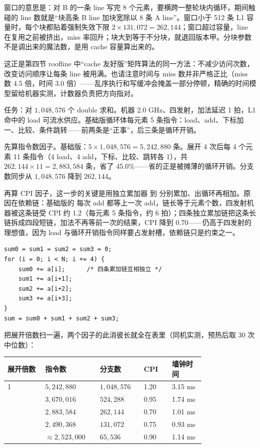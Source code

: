 窗口的意思是：对 B 的一条 line 写完 8 个元素，要横跨一整轮块内循环，期间触碰的 line 数就是“块高条 B line 加块宽除以 8 条 A line”。窗口小于 512 条 L1 容量时，每个块都贴着强制失效下限 $2\times131{,}072=262{,}144$；窗口超过容量，line 在复用之前被挤出，miss 率回升；块大到等于不分块，就退回版本甲。分块参数不是调出来的魔法数，是用 cache 容量算出来的。

这正是第四节 roofline 中“cache 友好版”矩阵算法的同一方法：不减少访问次数，改变访问顺序让每条 line 被用满。也请注意时间与 miss 数并非严格正比（miss 数 4.5 倍，时间 3.0 倍）——乱序执行和写缓冲会掩盖一部分停顿，精确的时间模型留给机器实测，计数器负责把方向指对。

任务：对 $1{,}048{,}576$ 个 double 求和。机器 2.0 GHz、四发射，加法延迟 1 拍，L1 命中的 load 可流水供应。基础版循环体每元素 5 条指令：load、add、下标加一、比较、条件跳转——前两条是“正事”，后三条是循环开销。

先算指令数因子。基础版：$5\times1{,}048{,}576=5{,}242{,}880$ 条。展开 4 次后每 4 个元素 11 条指令（4 load、4 add，下标、比较、跳转各 1），共 $262{,}144\times11=2{,}883{,}584$ 条，省了 45.0\%——省的正是被摊薄的循环开销。分支数同步从 $1{,}048{,}576$ 降到 $262{,}144$。

再算 CPI 因子，这一步的关键是用独立累加器  到  分别累加、出循环再相加。原因在依赖链：基础版的  每次 add 都等上一次 add，链长等于元素个数，四发射机器被这条链受 CPI 约 1.2（每元素 5 条指令，约 6 拍）；四条独立累加链把这条长链拆成四段短链，加法不再等前一次的结果，CPI 降到 0.70——仍高于四发射的理想值，因为 load 与循环开销指令同样要占发射槽，依赖链只是约束之一。

\begin{lstlisting}
sum0 = sum1 = sum2 = sum3 = 0;
for (i = 0; i < N; i += 4) {
    sum0 += a[i];      /* 四条累加链互相独立 */
    sum1 += a[i+1];
    sum2 += a[i+2];
    sum3 += a[i+3];
}
sum = sum0 + sum1 + sum2 + sum3;
\end{lstlisting}

把展开倍数扫一遍，两个因子的此消彼长就全在表里（同机实测，预热后取 30 次中位数）：

\begin{longtable}{L{0.16\linewidth}L{0.20\linewidth}L{0.16\linewidth}L{0.12\linewidth}L{0.14\linewidth}}
\toprule
展开倍数 & 指令数 & 分支数 & CPI & 墙钟时间 \\
 & $5{,}242{,}880$ & $1{,}048{,}576$ & 1.20 & 3.15 ms \\ & $3{,}670{,}016$ & $524{,}288$ & 0.95 & 1.74 ms \\ & $2{,}883{,}584$ & $262{,}144$ & 0.70 & 1.01 ms \\ & $2{,}490{,}368$ & $131{,}072$ & 0.75 & 0.93 ms \\ & $\approx2{,}523{,}000$ & $65{,}536$ & 0.90 & 1.14 ms \\
\bottomrule
\end{longtable}


